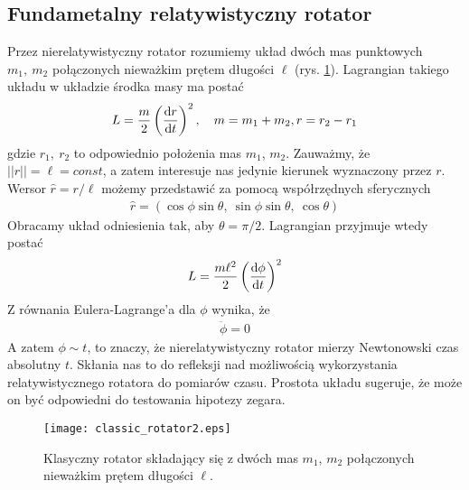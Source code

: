 \subsection{Fundametalny relatywistyczny rotator}
Przez nierelatywistyczny rotator rozumiemy układ dwóch mas punktowych
$m_1,\ m_2$ połączonych nieważkim
prętem długości $\ell$ (rys. \ref{classic_rotator}). Lagrangian 
takiego układu w układzie środka masy ma postać~\cite{landau1978krotki}
\begin{align*}
L = \frac{m }{2} \left(\frac{\text{d} r}{\text{d} t}\right)^2, 
\quad m=m_1+m_2, r=r_2-r_1
\end{align*}
gdzie $r_1,\ r_2$ to odpowiednio położenia mas $m_1$, $m_2$.
Zauważmy, że $||r|| =\ell = const$, a zatem interesuje nas jedynie kierunek 
wyznaczony przez $r$.
Wersor $ \hat{r} = r / \ell$ możemy przedstawić za pomocą  
współrzędnych sferycznych
\begin{align*}
\hat{r} = ( \cos \phi \sin\theta, \ \sin\phi\sin\theta,\ \cos\theta )
\end{align*}
Obracamy układ odniesienia tak, aby $\theta = \pi/2$. Lagrangian 
przyjmuje wtedy postać
\begin{align*}
L = \frac{m\ell^2 }{2} \left(\frac{\text{d} \phi}{\text{d} t}\right)^2
\end{align*}
Z równania Eulera-Lagrange'a dla $\phi$ wynika, że 
\begin{align*}
\ddot{\phi} = 0
\end{align*}
A zatem $\phi \sim t$, to znaczy, że 
nierelatywistyczny rotator mierzy Newtonowski czas
absolutny $t$. Skłania nas to do refleksji nad możliwością 
wykorzystania relatywistycznego rotatora 
do pomiarów czasu. Prostota układu sugeruje, że 
może on być odpowiedni do testowania hipotezy zegara.
\begin{figure}
\centering
\texttt{[image: classic\_rotator2.eps]}
\caption{Klasyczny rotator składający się z dwóch mas $m_1$, $m_2$ 
połączonych nieważkim prętem długości $\ell$.}
\label{classic_rotator}
\end{figure}

